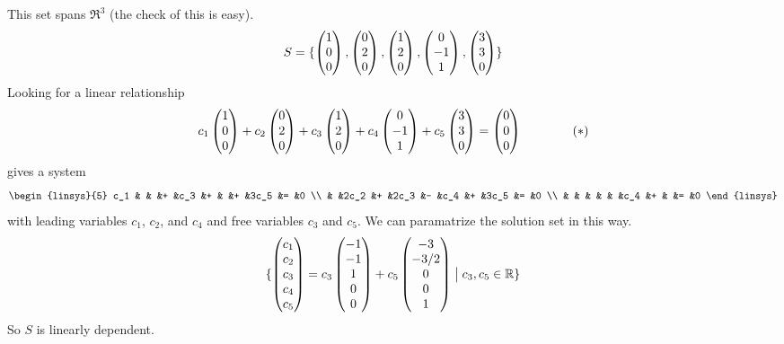 \begin{example}  \label{ex:ShrinkSetSameSpan}
This set spans \( \Re^3 \) (the check of this is easy).
\begin{equation*}
  S=\mbox{$\{\begin{pmatrix} 1 \\ 0 \\ 0 \end{pmatrix},
     \begin{pmatrix} 0 \\ 2 \\ 0 \end{pmatrix},
     \begin{pmatrix} 1 \\ 2 \\ 0 \end{pmatrix},
     \begin{pmatrix} 0 \\ -1 \\ 1 \end{pmatrix},
     \begin{pmatrix} 3 \\ 3 \\ 0 \end{pmatrix}  \}$}
\end{equation*}
Looking for a linear relationship
\begin{equation*}
  c_1\begin{pmatrix} 1 \\ 0 \\ 0 \end{pmatrix}
  +c_2\begin{pmatrix} 0 \\ 2 \\ 0 \end{pmatrix}
  +c_3\begin{pmatrix} 1 \\ 2 \\ 0 \end{pmatrix}
  +c_4\begin{pmatrix} 0 \\ -1 \\ 1 \end{pmatrix}
  +c_5\begin{pmatrix} 3 \\ 3 \\ 0 \end{pmatrix}
  =\begin{pmatrix} 0 \\ 0 \\ 0 \end{pmatrix}\qquad\tag{$*$}
\end{equation*}
gives a system 
\begin{equation*}
  \begin{linsys}{5}
     c_1  &   &      &+  &c_3   &+  &    &+  &3c_5 &= &0  \\
          &   &2c_2  &+  &2c_3  &-  &c_4 &+  &3c_5 &= &0  \\
          &   &      &   &     &   &c_4  &+  &     &= &0  
\end{linsys}
\end{equation*}
with leading variables $c_1$, $c_2$, and $c_4$ and
free variables $c_3$ and $c_5$.
We can paramatrize the solution set in this way.
\begin{equation*}
  \mbox{$\{\begin{pmatrix} c_1 \\ c_2 \\ c_3 \\ c_4 \\ c_5 \end{pmatrix}=
     c_3\begin{pmatrix} -1 \\ -1 \\ 1 \\ 0 \\ 0 \end{pmatrix}
     +c_5\begin{pmatrix} -3 \\ -3/2 \\ 0 \\ 0 \\ 1 \end{pmatrix}
     \bigm| c_3,c_5\in\mathbb{R} \}$}
\end{equation*}
So $S$ is linearly dependent.


\end{example}
